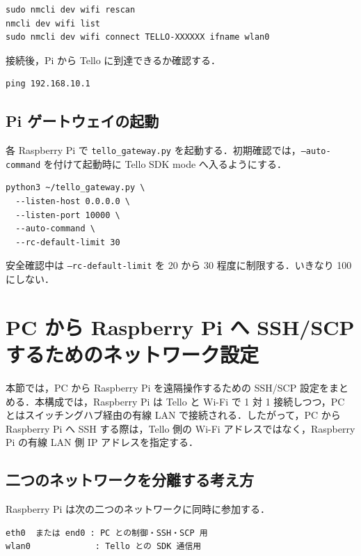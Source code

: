 \begin{lstlisting}
sudo nmcli dev wifi rescan
nmcli dev wifi list
sudo nmcli dev wifi connect TELLO-XXXXXX ifname wlan0
\end{lstlisting}

接続後，Pi から Tello に到達できるか確認する．

\begin{lstlisting}
ping 192.168.10.1
\end{lstlisting}

\subsection{Pi ゲートウェイの起動}

各 Raspberry Pi で \texttt{tello\_gateway.py} を起動する．初期確認では，\texttt{--auto-command} を付けて起動時に Tello SDK mode へ入るようにする．

\begin{lstlisting}
python3 ~/tello_gateway.py \
  --listen-host 0.0.0.0 \
  --listen-port 10000 \
  --auto-command \
  --rc-default-limit 30
\end{lstlisting}

安全確認中は \texttt{--rc-default-limit} を 20 から 30 程度に制限する．いきなり 100 にしない．


\section{PC から Raspberry Pi へ SSH/SCP するためのネットワーク設定}
\label{sec:ssh_scp_setup}

本節では，PC から Raspberry Pi を遠隔操作するための SSH/SCP 設定をまとめる．本構成では，Raspberry Pi は Tello と Wi-Fi で 1 対 1 接続しつつ，PC とはスイッチングハブ経由の有線 LAN で接続される．したがって，PC から Raspberry Pi へ SSH する際は，Tello 側の Wi-Fi アドレスではなく，Raspberry Pi の有線 LAN 側 IP アドレスを指定する．

\subsection{二つのネットワークを分離する考え方}

Raspberry Pi は次の二つのネットワークに同時に参加する．

\begin{lstlisting}
eth0  または end0 : PC との制御・SSH・SCP 用
wlan0             : Tello との SDK 通信用
\end{lstlisting}

